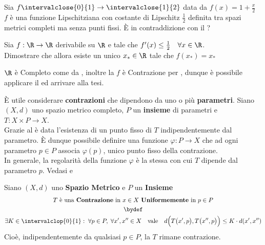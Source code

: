 \begin{exercise}
	Sia $f \intervalclose{0}{1} \to \intervalclose{1}{2}$ data da $f(x) = 1 + \frac{x}{2}$\\
	$f$ è una funzione Lipschitziana con costante di Lipschitz $\frac{1}{2}$ definita tra spazi metrici completi ma senza punti fissi. È in contraddizione con il ?
\end{exercise}
\begin{exercise}
	Sia $f:\R \to \R$ derivabile su $\R$ e tale che $f'(x) \leq \frac{1}{2} \quad \forall x \in \R$.\\
	Dimostrare che allora esiste un unico $x_* \in \R$ tale che $f(x_*) = x_*$
	\begin{solution}
		$\R$ è Completo come da , inoltre la $f$ è Contrazione per , dunque è possibile applicare il  ed arrivare alla tesi.
	\end{solution}
\end{exercise}

\begin{observation}
	\label{obs:contr_con_para}
	È utile considerare \textbf{contrazioni} che dipendono da uno o più \textbf{parametri}. Siano $(X,d)$ uno spazio metrico completo, $P$ un \textbf{insieme} di parametri e $T:X \times P \to X$.\\
	Grazie al  è data l'esistenza di un punto fisso di $T$ indipendentemente dal parametro. È dunque possibile definire una funzione $\varphi: P \to X$ che ad ogni parametro $p \in P$ associa $\varphi(p)$, unico punto fisso della contrazione.\\
	In generale, la regolarità della funzione $\varphi$ è la stessa con cui $T$ dipende dal parametro $p$. Vedasi  e 
\end{observation}

\begin{definition}
	\label{def:contrazione_parametro}
	Siano $(X,d)$ uno \textbf{Spazio Metrico} e $P$ un \textbf{Insieme}
	\begin{equation}
		\label{eq:contrazione_parametro}
		\begin{gathered}
			T \text{ è una \textbf{Contrazione} in } x \in X \text{ \textbf{Uniformemente} in } p \in P\\
			\bydef\\
			\exists K \in \intervalclop{0}{1}: \; \forall p \in P,\; \forall x', x'' \in X \quad \text{vale} \quad d \Bigl( T\bigl( x', p \bigr), T\bigl( x'', p \bigr) \Bigr) \leq K \cdot d(x', x'')
		\end{gathered}
	\end{equation}
	Cioè, indipendentemente da qualsiasi $p \in P$, la $T$ rimane contrazione.
\end{definition}

